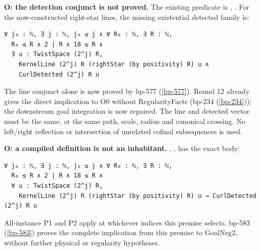 \begin{theorem}
\label{open-curlline}
\textbf{O: the detection conjunct is not proved.} The existing predicate is \texttt{}, \texttt{}. For the now-constructed right-star lines, the missing existential detected family is:

\begin{verbatim}
∀ j₀ : ℕ, ∃ j : ℕ, j₀ ≤ j ∧ ∀ R₀ : ℕ, ∃ R : ℕ,
  R₀ ≤ R ∧ 2 ∣ R ∧ 18 ≤ R ∧
  ∃ u : TwistSpace (2^j) R,
    KernelLine (2^j) R (rightStar (by positivity) R) u ∧
    CurlDetected (2^j) R u
\end{verbatim}

The line conjunct alone is now proved by bp-577 (\ref{bp-577}). Round 12 already gives the direct implication to O0 without RegularityFacts (bp-234 (\ref{bp-234})); the downstream goal integration is now repaired. The line and detected vector must be the same, at the same path, scale, radius and canonical crossing. No left/right reflection or intersection of unrelated cofinal subsequences is used.

\end{theorem}

\begin{theorem}
\label{open-cofinal-p3}
\textbf{O: a compiled definition is not an inhabitant.} \texttt{}, \texttt{}, has the exact body:

\begin{verbatim}
∀ j₀ : ℕ, ∃ j : ℕ, j₀ ≤ j ∧ ∀ R₀ : ℕ, ∃ R : ℕ,
  R₀ ≤ R ∧ 2 ∣ R ∧ 18 ≤ R ∧
  ∀ u : TwistSpace (2^j) R,
    KernelLine (2^j) R (rightStar (by positivity) R) u → CurlDetected (2^j) R u
\end{verbatim}

All-instance P1 and P2 apply at whichever indices this premise selects. bp-583 (\ref{bp-583}) proves the complete implication from this premise to GoalNeg2, without further physical or regularity hypotheses.

\end{theorem}

